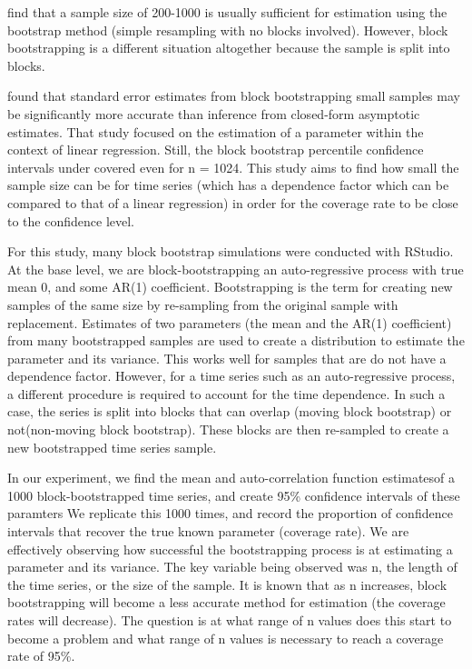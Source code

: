 \documentclass[12pt, letterpaper, titlepage]{article}
\begin{document}
\citet{nevitt2001performance} find that a sample size of 200-1000 is usually sufficient for estimation using the bootstrap method (simple resampling with no blocks involved). However, block bootstrapping is a different situation altogether because the sample is split into blocks.

\citet{goncalves2005bootstrap} found that standard error estimates from block bootstrapping small 
samples 
may be significantly more accurate than inference from closed-form asymptotic estimates. That study focused on the estimation of a parameter within the context of linear regression. Still, the block bootstrap percentile confidence intervals under covered even for n = 1024. This study aims to find how small the sample size can be for time series (which has a dependence factor which can be compared to that of a linear regression) in order for the coverage rate to be close to the confidence level.

For this study, many block bootstrap simulations were conducted with RStudio. At the base
level, we are block-bootstrapping an auto-regressive process with true mean 0, and some AR(1) coefficient.
Bootstrapping is the term for creating new samples of the same size by re-sampling from
the original sample with replacement. Estimates of two parameters (the mean and the AR(1) coefficient) from many bootstrapped samples are used to create a
distribution to estimate the parameter and its variance. This works well for samples
that are do not have a dependence factor. However, for a time series such as an auto-regressive process,
a different procedure is required to account for the time dependence. In such a case,
the series is split into blocks that can overlap (moving block bootstrap) or not(non-moving block bootstrap). These blocks are then re-sampled to create a new
bootstrapped time series sample. 

In our experiment, we find the mean and auto-correlation function estimatesof a 1000 block-bootstrapped time series, 
and create 95\% confidence intervals of these paramters We replicate this 1000 times, 
and record the proportion of confidence intervals that recover the true known parameter 
(coverage rate). We are effectively observing how successful the bootstrapping process
is at estimating a parameter and its variance. The key variable being observed was n, 
the length of the time series, or the size of the sample. It is known that as n
increases, block bootstrapping will become a less accurate method for estimation
(the coverage rates will decrease). The question is at what range of n values does this
start to become a problem and what range of n values is necessary to reach a coverage rate of 95\%.
\end{document}
